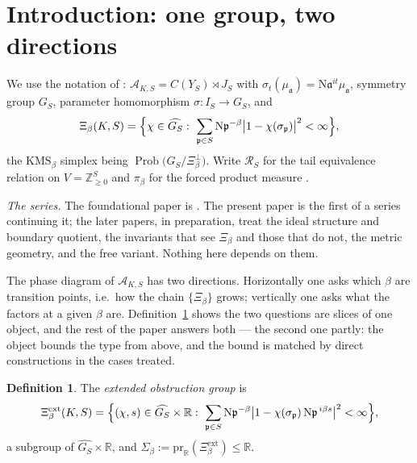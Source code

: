 \documentclass[11pt]{amsart}
\numberwithin{equation}{section}
\theoremstyle{definition}
\newtheorem{definition}[theorem]{Definition}
\theoremstyle{remark}
\newcommand{\Z}{\mathbb{Z}}
\newcommand{\R}{\mathbb{R}}
\newcommand{\cA}{\mathcal{A}}
\newcommand{\cR}{\mathcal{R}}
\newcommand{\pp}{\mathfrak{p}}
\newcommand{\aaa}{\mathfrak{a}}
\newcommand{\Ns}{\mathrm{N}}
\newcommand{\Prob}{\operatorname{Prob}}
\newcommand{\Xiext}{\Xi^{\mathrm{ext}}_\beta}
\begin{document}
\maketitle

\tableofcontents

\section{Introduction: one group, two directions}

We use the notation of \cite{Main}: $\cA_{K,S}=C(Y_S)\rtimes J_S$ with
$\sigma_t(\mu_\aaa)=\Ns\aaa^{it}\mu_\aaa$, symmetry group $G_S$, parameter homomorphism
$\sigma:I_S\to G_S$, and
\begin{equation}\label{eq:Xi}
\Xi_\beta(K,S)=\Bigl\{\chi\in\widehat{G_S}:\ \sum_{\pp\in S}\Ns\pp^{-\beta}\bigl|1-\chi(\sigma_\pp)\bigr|^2<\infty\Bigr\},
\end{equation}
the $\mathrm{KMS}_\beta$ simplex being $\Prob\bigl(G_S/\Xi_\beta^\perp\bigr)$. Write
$\cR_S$ for the tail equivalence relation on $V=\Z_{\ge0}^S$ and $\pi_\beta$ for the forced
product measure \cite[Lem.~2.10]{Main}.

\emph{The series.} The foundational paper is \cite{Main}. The present paper is the first
of a series continuing it; the later papers, in preparation, treat the ideal structure and
boundary quotient, the invariants that see $\Xi_\beta$ and those that do not, the metric
geometry, and the free variant. Nothing here depends on them.

The phase diagram of $\cA_{K,S}$ has two directions. Horizontally one asks which
$\beta$ are transition points, i.e.\ how the chain $\{\Xi_\beta\}$ grows; vertically one asks
what the factors at a given $\beta$ are. Definition~\ref{def:Xiext} shows the two questions
are slices of one object, and the rest of the paper answers both --- the second one
partly: the object bounds the type from above, and the bound is matched by direct
constructions in the cases treated.

\begin{definition}\label{def:Xiext}
The \emph{extended obstruction group} is
\begin{equation}\label{eq:Xiext}
\Xiext(K,S)=\Bigl\{(\chi,s)\in\widehat{G_S}\times\R:\
\sum_{\pp\in S}\Ns\pp^{-\beta}\bigl|1-\chi(\sigma_\pp)\,\Ns\pp^{\,i\beta s}\bigr|^2<\infty\Bigr\},
\end{equation}
a subgroup of $\widehat{G_S}\times\R$, and $\Sigma_\beta:=\mathrm{pr}_\R(\Xiext)\le\R$.
\end{definition}
\end{document}
